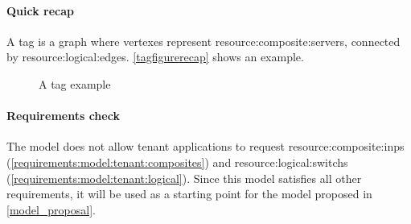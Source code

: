 \paragraph{Quick recap}
A \gls{tag} is a graph where vertexes represent \glspl{resource:composite:server}, connected by \glspl{resource:logical:edge}.
\autoref{tagfigurerecap} shows an example.

\begin{figure}[!htb]
    \centering
    \usebox{\tagfigure}
    \caption{A \gls{tag} example}
    \label{tagfigurerecap}
\end{figure}

\paragraph{Requirements check}
The model does not allow tenant applications to request \glspl{resource:composite:inp} (\xmark \ref{requirements:model:tenant:composites}) and \glspl{resource:logical:switch} (\xmark \ref{requirements:model:tenant:logical}).
Since this model satisfies all other requirements, it will be used as a starting point for the \gls{model} proposed in \autoref{model_proposal}.